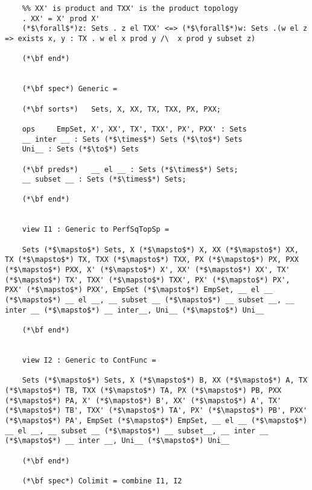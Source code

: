 \documentclass{standalone}
\begin{document}
\begin{lstlisting}
	%% XX' is product and TXX' is the product topology
	. XX' = X' prod X'
	(*$\forall$*)z: Sets . z el TXX' <=> (*$\forall$*)w: Sets .(w el z => exists x, y : TX . w el x prod y /\  x prod y subset z) 
	
	(*\bf end*)
	
	
	(*\bf spec*) Generic =
	
	(*\bf sorts*)   Sets, X, XX, TX, TXX, PX, PXX;
	
	ops 	EmpSet, X', XX', TX', TXX', PX', PXX' : Sets
	__ inter __ : Sets (*$\times$*) Sets (*$\to$*) Sets
	Uni__ : Sets (*$\to$*) Sets
	
	(*\bf preds*)   __ el __ : Sets (*$\times$*) Sets;
	__ subset __ : Sets (*$\times$*) Sets;
	
	(*\bf end*)
	
	
	view I1 : Generic to PerfSqTopSp =
	
	Sets (*$\mapsto$*) Sets, X (*$\mapsto$*) X, XX (*$\mapsto$*) XX, TX (*$\mapsto$*) TX, TXX (*$\mapsto$*) TXX, PX (*$\mapsto$*) PX, PXX (*$\mapsto$*) PXX, X' (*$\mapsto$*) X', XX' (*$\mapsto$*) XX', TX' (*$\mapsto$*) TX', TXX' (*$\mapsto$*) TXX', PX' (*$\mapsto$*) PX', PXX' (*$\mapsto$*) PXX', EmpSet (*$\mapsto$*) EmpSet, __ el __ (*$\mapsto$*) __ el __, __ subset __ (*$\mapsto$*) __ subset __, __ inter __ (*$\mapsto$*) __ inter__, Uni__ (*$\mapsto$*) Uni__
	
	(*\bf end*)
	
	
	view I2 : Generic to ContFunc =
	
	Sets (*$\mapsto$*) Sets, X (*$\mapsto$*) B, XX (*$\mapsto$*) A, TX (*$\mapsto$*) TB, TXX (*$\mapsto$*) TA, PX (*$\mapsto$*) PB, PXX (*$\mapsto$*) PA, X' (*$\mapsto$*) B', XX' (*$\mapsto$*) A', TX' (*$\mapsto$*) TB', TXX' (*$\mapsto$*) TA', PX' (*$\mapsto$*) PB', PXX' (*$\mapsto$*) PA', EmpSet (*$\mapsto$*) EmpSet, __ el __ (*$\mapsto$*) __ el __, __ subset __ (*$\mapsto$*) __ subset__, __ inter __ (*$\mapsto$*) __ inter __, Uni__ (*$\mapsto$*) Uni__
	
	(*\bf end*)
	
	(*\bf spec*) Colimit = combine I1, I2
	\end{lstlisting}
\end{document}

